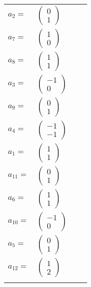 \documentclass[1p]{elsarticle_modified}
\theoremstyle{definition}
\begin{document}
\begin{tabular}{m{7pt} m{180pt} m{7pt} m{180pt} }
\flushright $a_{2}=$&$\begin{pmatrix}0\\1\end{pmatrix}$ \\
\flushright $a_{7}=$&$\begin{pmatrix}1\\0\end{pmatrix}$ \\
\flushright $a_{8}=$&$\begin{pmatrix}1\\1\end{pmatrix}$ \\
\flushright $a_{3}=$&$\begin{pmatrix}-1\\0\end{pmatrix}$ \\
\flushright $a_{9}=$&$\begin{pmatrix}0\\1\end{pmatrix}$ \\
\flushright $a_{4}=$&$\begin{pmatrix}-1\\-1\end{pmatrix}$ \\
\flushright $a_{1}=$&$\begin{pmatrix}1\\1\end{pmatrix}$ \\
\flushright $a_{11}=$&$\begin{pmatrix}0\\1\end{pmatrix}$ \\
\flushright $a_{6}=$&$\begin{pmatrix}1\\1\end{pmatrix}$ \\
\flushright $a_{10}=$&$\begin{pmatrix}-1\\0\end{pmatrix}$ \\
\flushright $a_{5}=$&$\begin{pmatrix}0\\1\end{pmatrix}$ \\
\flushright $a_{12}=$&$\begin{pmatrix}1\\2\end{pmatrix}$\\&\end{tabular}
\end{document}
